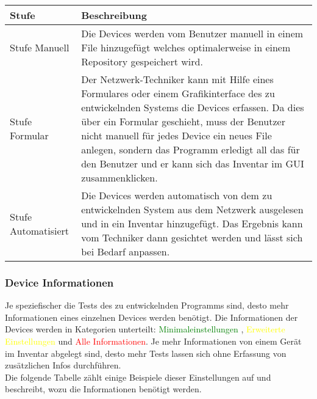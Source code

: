 \documentclass[
	ngerman,
	toc=listof, %
	toc=bibliography, %
	footnotes=multiple, %
	parskip=half, %
	numbers=noendperiod %
]{scrartcl}
\begin{document}
			\begin{tabularx}{\textwidth}{lX}
				\toprule
				Stufe & Beschreibung\\
				\midrule
				Stufe Manuell & Die Devices werden vom Benutzer manuell in einem File hinzugefügt welches optimalerweise in einem Repository gespeichert wird. \\
				\midrule
				Stufe Formular & Der Netzwerk-Techniker kann mit Hilfe eines Formulares oder einem Grafikinterface des zu entwickelnden Systems die Devices erfassen. Da dies über ein Formular geschieht, muss der Benutzer nicht manuell für jedes Device ein neues File anlegen, sondern das Programm erledigt all das für den Benutzer und er kann sich das Inventar im GUI zusammenklicken.\\
				\midrule
				Stufe Automatisiert & Die Devices werden automatisch von dem zu entwickelnden System aus dem Netzwerk ausgelesen und in ein Inventar hinzugefügt. Das Ergebnis kann vom Techniker dann gesichtet werden und lässt sich bei Bedarf anpassen. \\
				\bottomrule
			\end{tabularx}
			\newpage

		\subsubsection{Device Informationen}
			Je speziefischer die Tests des zu entwickelnden Programms sind, desto mehr Informationen eines einzelnen Devices werden benötigt.
			Die Informationen der Devices werden in Kategorien unterteilt: \textcolor{green}{Minimaleinstellungen} , \textcolor{yellow}{Erweiterte Einstellungen} und \textcolor{red}{Alle Informationen}.
			Je mehr Informationen von einem Gerät im Inventar abgelegt sind, desto mehr Tests lassen sich ohne Erfassung von zusätzlichen Infos durchführen. \\
			Die folgende Tabelle zählt einige Beispiele dieser Einstellungen auf und beschreibt, wozu die Informationen benötigt werden.
\end{document}
